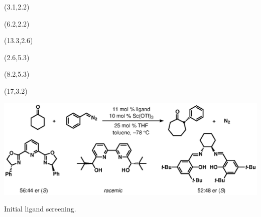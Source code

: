 \begin{Scheme}[h]
  \centering
  \begin{textblock}{1}(3.1,2.2)  \end{textblock}
  \begin{textblock}{1}(6.2,2.2)  \end{textblock}
  \begin{textblock}{1}(13.3,2.6)  \end{textblock}
  \begin{textblock}{1}(2.6,5.3)  \end{textblock}
  \begin{textblock}{1}(8.2,5.3)  \end{textblock}
  \begin{textblock}{1}(17,3.2)  \end{textblock}
  \includegraphics[scale=0.8]{chp_asymmetric/images/initialligandscreen}
  \caption{Initial ligand screening.}
  \label{sch:asinitialligandscreen}
\end{Scheme}  



